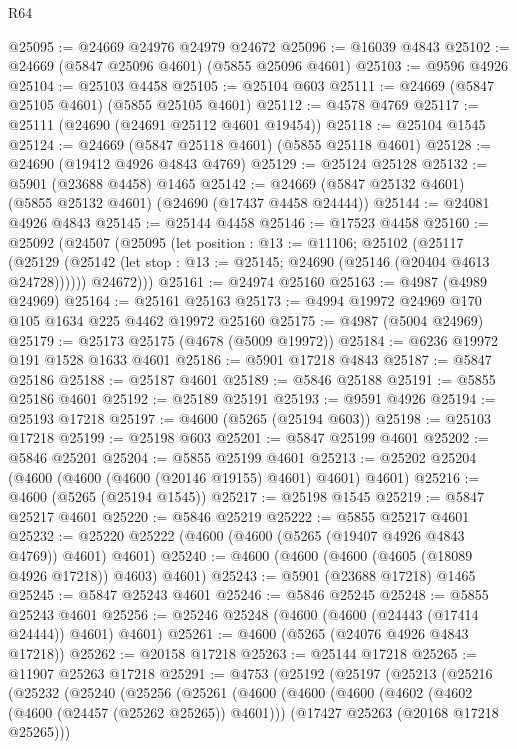 \begin{lexlean}{R64}
\begin{coremodule}
@25095 := @24669 @24976 @24979 @24672
@25096 := @16039 @4843
@25102 := @24669 (@5847 @25096 @4601) (@5855 @25096 @4601)
@25103 := @9596 @4926
@25104 := @25103 @4458
@25105 := @25104 @603
@25111 := @24669 (@5847 @25105 @4601) (@5855 @25105 @4601)
@25112 := @4578 @4769
@25117 := @25111 (@24690 (@24691 @25112 @4601 @19454))
@25118 := @25104 @1545
@25124 := @24669 (@5847 @25118 @4601) (@5855 @25118 @4601)
@25128 := @24690 (@19412 @4926 @4843 @4769)
@25129 := @25124 @25128
@25132 := @5901 (@23688 @4458) @1465
@25142 := @24669 (@5847 @25132 @4601) (@5855 @25132 @4601) (@24690 (@17437 @4458 @24444))
@25144 := @24081 @4926 @4843
@25145 := @25144 @4458
@25146 := @17523 @4458
@25160 := @25092
    (@24507
      (@25095
        (let position : @13 := @11106;
        @25102
          (@25117
            (@25129 (@25142 (let stop : @13 := @25145; @24690 (@25146 (@20404 @4613 @24728))))))
          @24672)))
@25161 := @24974 @25160
@25163 := @4987 (@4989 @24969)
@25164 := @25161 @25163
@25173 := @4994 @19972 @24969 @170 @105 @1634 @225 @4462 @19972 @25160
@25175 := @4987 (@5004 @24969)
@25179 := @25173 @25175 (@4678 (@5009 @19972))
@25184 := @6236 @19972 @191 @1528 @1633 @4601
@25186 := @5901 @17218 @4843
@25187 := @5847 @25186
@25188 := @25187 @4601
@25189 := @5846 @25188
@25191 := @5855 @25186 @4601
@25192 := @25189 @25191
@25193 := @9591 @4926
@25194 := @25193 @17218
@25197 := @4600 (@5265 (@25194 @603))
@25198 := @25103 @17218
@25199 := @25198 @603
@25201 := @5847 @25199 @4601
@25202 := @5846 @25201
@25204 := @5855 @25199 @4601
@25213 := @25202 @25204 (@4600 (@4600 (@4600 (@20146 @19155) @4601) @4601) @4601)
@25216 := @4600 (@5265 (@25194 @1545))
@25217 := @25198 @1545
@25219 := @5847 @25217 @4601
@25220 := @5846 @25219
@25222 := @5855 @25217 @4601
@25232 := @25220 @25222 (@4600 (@4600 (@5265 (@19407 @4926 @4843 @4769)) @4601) @4601)
@25240 := @4600 (@4600 (@4600 (@4605 (@18089 @4926 @17218)) @4603) @4601)
@25243 := @5901 (@23688 @17218) @1465
@25245 := @5847 @25243 @4601
@25246 := @5846 @25245
@25248 := @5855 @25243 @4601
@25256 := @25246 @25248 (@4600 (@4600 (@24443 (@17414 @24444)) @4601) @4601)
@25261 := @4600 (@5265 (@24076 @4926 @4843 @17218))
@25262 := @20158 @17218
@25263 := @25144 @17218
@25265 := @11907 @25263 @17218
@25291 := @4753
    (@25192
      (@25197
        (@25213
          (@25216
            (@25232
              (@25240
                (@25256
                  (@25261
                    (@4600
                      (@4600
                        (@4600
                          (@4602 (@4602 (@4600 (@24457 (@25262 @25265)) @4601)))
                          (@17427 @25263 (@20168 @17218 @25265)))

\end{coremodule}
\end{lexlean}
